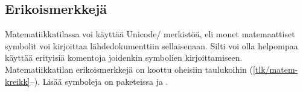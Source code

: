 \subsection{Erikoismerkkejä}

Matematiikkatilassa voi käyttää Unicode\-/ merkistöä, eli monet
matemaattiset symbolit voi kirjoittaa lähdedokumenttiin sellaisenaan.
Silti voi olla helpompaa käyttää erityisiä komentoja joidenkin symbolien
kirjoittamiseen. Matematiikkatilan erikoismerkkejä on koottu oheisiin
taulukoihin (\ref{tlk/matem-kreikk}--). Lisää symboleja on paketeissa
 ja .

